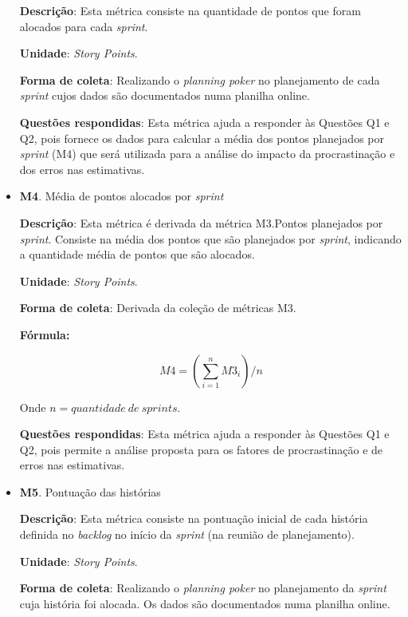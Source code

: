 \begin{itemize}
	   \subitem \textbf{Descrição}: Esta métrica consiste na quantidade de pontos que foram alocados para cada \textit{sprint}.
	   
	   \subitem \textbf{Unidade}: \textit{Story Points}.
	   
	   \subitem \textbf{Forma de coleta}: Realizando o \textit{planning poker} no planejamento de cada \textit{sprint} 
		    cujos dados são documentados numa planilha online.
	   
	   \subitem \textbf{Questões respondidas}: Esta métrica ajuda a responder às Questões Q1 e Q2, pois fornece os dados para
		    calcular a média dos pontos planejados por \textit{sprint} (M4) que será utilizada para a análise do impacto 
		    da procrastinação e dos erros nas estimativas.
	  
	 \item \textbf{M4}. Média de pontos alocados por \textit{sprint}
	 
	   \subitem \textbf{Descrição}: Esta métrica é derivada da métrica M3.Pontos planejados por \textit{sprint}.
		    Consiste na média dos pontos que são planejados por \textit{sprint}, indicando a quantidade média 
		    de pontos que são alocados.
	   
	   \subitem \textbf{Unidade}: \textit{Story Points}.
	   
	   \subitem \textbf{Forma de coleta}: Derivada da coleção de métricas M3.
	   
	      \subsubitem \textbf{Fórmula:} 
	      
		$$ M4 = (\sum\limits_{i=1}^{n}M3_i)/n $$
		
	      \subsubitem Onde $n = quantidade\ de\ sprints$.
	   
	   \subitem \textbf{Questões respondidas}: Esta métrica ajuda a responder às Questões Q1 e Q2, pois permite a análise 
		    proposta para os fatores de procrastinação e de erros nas estimativas.
	 
	 \item \textbf{M5}. Pontuação das histórias
	  
	   \subitem \textbf{Descrição}: Esta métrica consiste na pontuação inicial de cada história definida no \textit{backlog} no início
		    da \textit{sprint} (na reunião de planejamento).
	   
	   \subitem \textbf{Unidade}: \textit{Story Points}.
	   
	   \subitem \textbf{Forma de coleta}: Realizando o \textit{planning poker} no planejamento da \textit{sprint}
		    cuja história foi alocada. Os dados são documentados numa planilha online.
	   

\end{itemize}

